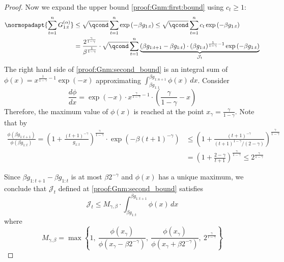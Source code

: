\begin{proof}
    Now we expand the upper bound \eqref{proof:Gnm:first:bound} using $c_t \geq 1$:
    \begin{align}
        \label{proof:Gnm:second_bound}
        \normopadapt{\sum_{t=1}^n G_{1:t}^{(\alpha)}} &\leq \sqrt{\qcond}
        \sum_{t=1}^n \exp\left(- \beta g_{1:t}\right) \leq \sqrt{\qcond}
        \sum_{t=1}^n c_t \exp\left(- \beta g_{1:t}\right)\\ &= \frac{2^{\frac{\gamma}{1-\gamma}}}{\beta^{\frac{1}{1-\gamma}}} \cdot \sqrt{\qcond}
        \sum_{t=1}^n \underbrace{(\beta g_{1:t+1} - \beta g_{1:t}) \cdot (\beta g_{1:t})^{\frac{1}{1-\gamma} - 1} \exp\left(- \beta g_{1:t}\right)}_{\mathcal{J}_t}
    \end{align}
    The right hand side of \eqref{proof:Gnm:second_bound} is an integral sum of $\phi(x) = x^{\frac{1}{1-\gamma} - 1} \exp(-x)$ approximating $\int_{\beta g_{1:1}}^{\beta g_{1:n+1}} \phi (x) \, d x$. Consider
    \begin{equation}
        \frac{d \phi}{d x} = \exp(-x) \cdot x^{\frac{\gamma}{1-\gamma} - 1} \cdot \left(\frac{\gamma}{1-\gamma} - x\right)
    \end{equation}
    Therefore, the maximum value of $\phi(x)$ is reached at the point $x_\gamma = \frac{\gamma}{1-\gamma}$. Note that by {}
    \begin{align}
        \frac{\phi(\beta g_{1:t+1})}{\phi(\beta g_{1:t})} = \left(1 + \frac{(t+1)^{-\gamma}}{g_{1:t}}\right)^{\frac{\gamma}{1-\gamma}} \cdot \exp(-\beta (t+1)^{-\gamma}) &\leq \left(1+\frac{(t+1)^{-\gamma}}{(t+1)^{1-\gamma}/(2-\gamma)}\right)^{\frac{\gamma}{1 - \gamma}} \\ &= \left(1+ \frac{2 - \gamma}{t+1}\right)^{\frac{\gamma}{1-\gamma}} \leq 2^{\frac{\gamma}{1-\gamma}} 
    \end{align}

    Since $\beta g_{1:t+1} - \beta g_{1:t}$ is at most $\beta 2^{-\gamma}$ and $\phi(x)$ has a unique maximum, we conclude that $\mathcal{J}_t$ defined at \eqref{proof:Gnm:second_bound} satisfies
    \begin{equation}
        \label{proof:Gnmbound:Jtbound}
        \mathcal{J}_t \leq M_{\gamma, \beta} \cdot \int_{\beta g_{1:t}}^{\beta g_{1:t+1}} \phi(x) \, d x
    \end{equation}
    where
    \begin{equation}
        \label{def:Mgamma}
        M_{\gamma, \beta} = \max\left\{1, ~ \frac{\phi(x_\gamma)}{\phi(x_\gamma-\beta 2^{-\gamma})}, ~ \frac{\phi(x_\gamma)}{\phi(x_\gamma + \beta 2^{-\gamma})}, ~ 2^{\frac{\gamma}{1-\gamma}}\right\}
    \end{equation}


\end{proof}
